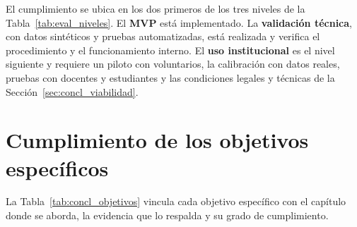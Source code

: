 El cumplimiento se ubica en los dos primeros de los tres niveles de la Tabla~\ref{tab:eval_niveles}. El \textbf{MVP} está implementado. La \textbf{validación técnica}, con datos sintéticos y pruebas automatizadas, está realizada y verifica el procedimiento y el funcionamiento interno. El \textbf{uso institucional} es el nivel siguiente y requiere un piloto con voluntarios, la calibración con datos reales, pruebas con docentes y estudiantes y las condiciones legales y técnicas de la Sección~\ref{sec:concl_viabilidad}.

\section{Cumplimiento de los objetivos específicos}
\label{sec:concl_objetivos_especificos}

La Tabla~\ref{tab:concl_objetivos} vincula cada objetivo específico con el capítulo donde se aborda, la evidencia que lo respalda y su grado de cumplimiento.

